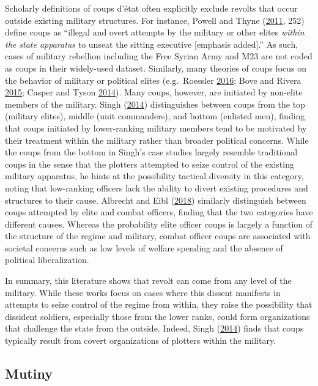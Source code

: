 \documentclass[
  12pt,
]{article}
\begin{document}
Scholarly definitions of coups d'état often explicitly exclude revolts that occur outside existing military structures. For instance, Powell and Thyne (\protect\hyperlink{ref-Powell2011}{2011}, 252) define coups as ``illegal and overt attempts by the military or other elites \emph{within the state apparatus} to unseat the sitting executive {[}emphasis added{]}.'' As such, cases of military rebellion including the Free Syrian Army and M23 are not coded as coups in their widely-used dataset. Similarly, many theories of coups focus on the behavior of military or political elites (e.g.~Roessler \protect\hyperlink{ref-Roessler2016}{2016}; Bove and Rivera \protect\hyperlink{ref-Bove2015a}{2015}; Casper and Tyson \protect\hyperlink{ref-Casper2014}{2014}). Many coups, however, are initiated by non-elite members of the military. Singh (\protect\hyperlink{ref-Singh2014}{2014}) distinguishes between coups from the top (military elites), middle (unit commanders), and bottom (enlisted men), finding that coups initiated by lower-ranking military members tend to be motivated by their treatment within the military rather than broader political concerns. While the coups from the bottom in Singh's case studies largely resemble traditional coups in the sense that the plotters attempted to seize control of the existing military apparatus, he hints at the possibility tactical diversity in this category, noting that low-ranking officers lack the ability to divert existing procedures and structures to their cause. Albrecht and Eibl (\protect\hyperlink{ref-Albrecht2018a}{2018}) similarly distinguish between coups attempted by elite and combat officers, finding that the two categories have different causes. Whereas the probability elite officer coups is largely a function of the structure of the regime and military, combat officer coups are associated with societal concerns such as low levels of welfare spending and the absence of political liberalization.

In summary, this literature shows that revolt can come from any level of the military. While these works focus on cases where this dissent manifests in attempts to seize control of the regime from within, they raise the possibility that dissident soldiers, especially those from the lower ranks, could form organizations that challenge the state from the outside. Indeed, Singh (\protect\hyperlink{ref-Singh2014}{2014}) finds that coups typically result from covert organizations of plotters within the military.

\hypertarget{mutiny}{%
\subsection{Mutiny}\label{mutiny}}
\end{document}
